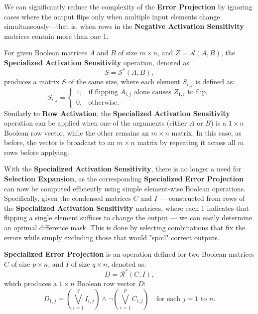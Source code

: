 \documentclass[pmlr]{jmlr}
\begin{document}
We can significantly reduce the complexity of the \textbf{Error Projection} by ignoring cases where the output flips only when multiple input elements change simultaneously—that is, when rows in the \textbf{Negative Activation Sensitivity} matrices contain more than one 1.

\begin{definition}
    For given Boolean matrices \( A \) and \( B \) of size \( m \times n \), and \( Z = \mathcal{A}(A, B) \), the \textbf{Specialized Activation Sensitivity} operation, denoted as
    \[ S = \mathcal{S}^*(A, B), \]
    produces a matrix \( S \) of the same size, where each element \( S_{i,j} \) is defined as:
    \[ S_{i,j} =
        \begin{cases}
            1, & \text{if flipping } A_{i,j} \text{ alone causes } Z_{1,i} \text{ to flip}, \\
            0, & \text{otherwise}.
        \end{cases}
    \]
    Similarly to \textbf{Row Activation}, the \textbf{Specialized Activation Sensitivity} operation can be applied when one of the arguments (either \( A \) or \( B \)) is a \( 1 \times n \) Boolean row vector, while the other remains an \( m \times n \) matrix. In this case, as before, the vector is broadcast to an \( m \times n \) matrix by repeating it across all \( m \) rows before applying.
\end{definition}

With the \textbf{Specialized Activation Sensitivity}, there is no longer a need for \textbf{Selection Expansion}, as the corresponding \textbf{Specialized Error Projection} can now be computed efficiently using simple element-wise Boolean operations. Specifically, given the condensed matrices \( C \) and \( I \) — constructed from rows of the \textbf{Specialized Activation Sensitivity} matrices, where each 1 indicates that flipping a single element suffices to change the output — we can easily determine an optimal difference mask. This is done by selecting combinations that fix the errors while simply excluding those that would "spoil" correct outputs.

\begin{definition}
    \textbf{Specialized Error Projection} is an operation defined for two Boolean matrices \( C \) of size \( p \times n \), and \( I \) of size \( q \times n \), denoted as:
    \[ D = \mathcal{R}^*(C, I), \]
    which produces a \( 1 \times n \) Boolean row vector \( D \):
    \[ D_{1,j} = \left( \bigvee_{i=1}^{q} I_{i,j} \right) \wedge \neg \left( \bigvee_{i=1}^{p} C_{i,j} \right) \quad \text{for each } j = 1 \text{ to } n.
    \]
\end{definition}
\end{document}
